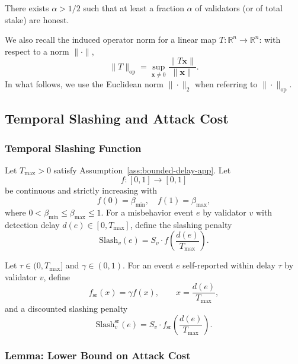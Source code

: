 \documentclass[11pt]{article}
\begin{document}
\begin{assumption}
\label{ass:honest-majority-app}
There exists \(\alpha > 1/2\) such that at least a fraction \(\alpha\) of validators (or of total stake) are honest.
\end{assumption}

We also recall the induced operator norm for a linear map \(T:\mathbb{R}^n \to \mathbb{R}^n\): with respect to a norm \(\|\cdot\|\),
\[
\|T\|_{\mathrm{op}} = \sup_{\bm{x} \neq 0} \frac{\|T\bm{x}\|}{\|\bm{x}\|}.
\]
In what follows, we use the Euclidean norm \(\|\cdot\|_2\) when referring to \(\|\cdot\|_{\mathrm{op}}\).

\subsection{Temporal Slashing and Attack Cost}

\subsubsection{Temporal Slashing Function}

\begin{definition}
\label{def:temporal-slash-app}
Let \(T_{\max} > 0\) satisfy Assumption~\ref{ass:bounded-delay-app}. Let
\[
f : [0,1] \to [0,1]
\]
be continuous and strictly increasing with
\[
f(0) = \beta_{\min}, \quad f(1) = \beta_{\max},
\]
where \(0 < \beta_{\min} \le \beta_{\max} \le 1\).
For a misbehavior event \(e\) by validator \(v\) with detection delay \(d(e) \in [0,T_{\max}]\), define the slashing penalty
\[
\mathrm{Slash}_v(e) = S_v \cdot f\!\left(\frac{d(e)}{T_{\max}}\right).
\]
\end{definition}

\begin{definition}
\label{def:self-report-app}
Let \(\tau \in (0,T_{\max}]\) and \(\gamma \in (0,1)\). For an event \(e\) self-reported within delay \(\tau\) by validator \(v\), define
\[
f_{\mathrm{sr}}(x) = \gamma f(x), \qquad x = \frac{d(e)}{T_{\max}},
\]
and a discounted slashing penalty
\[
\mathrm{Slash}^{\mathrm{sr}}_v(e) = S_v \cdot f_{\mathrm{sr}}\!\left(\frac{d(e)}{T_{\max}}\right).
\]
\end{definition}

\subsubsection{Lemma: Lower Bound on Attack Cost}
\end{document}
